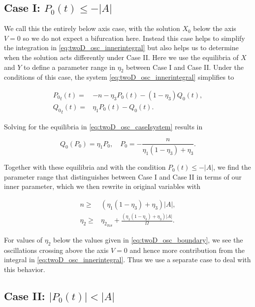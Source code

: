 \subsection{Case I: $P_0(t)\le -|A|$}
\label{subsec:twoD_highfreqosc_caseI}

We call this the entirely below axis case, with the solution $X_0$ below the axis $V=0$ so we do not expect a bifurcation here. Instead this case helps to simplify the integration in \eqref{eq:twoD_osc_innerintegral} but also helps us to determine when the solution acts differently under Case II. Here we use the equilibria of $X$ and $Y$ to define a parameter range in $\eta_2$ between Case I and Case II. Under the conditions of this case, the system \eqref{eq:twoD_osc_innerintegral} simplifies to

\begin{equation}\label{eq:twoD_osc_caseIsystem}
\begin{aligned}
{P_0}_t(t) =& -n -\eta_3P_0(t)-(1-\eta_3)Q_0(t),\\
{Q_0}_t(t) =& \eta_1P_0(t)-Q_0(t).
\end{aligned}
\end{equation}

Solving for the equilibria in \eqref{eq:twoD_osc_caseIsystem} results in

\begin{equation*}
Q_0(P_0)=\eta_1P_0,\quad P_0=-\frac{n}{\eta_1(1-\eta_3)+\eta_3}. 
\end{equation*}

Together with these equilibria and with the condition $P_0(t)\le -|A|$, we find the parameter range that distinguishes between Case I and Case II in terms of our inner parameter, which we then rewrite in original variables with

\begin{equation}\label{eq:twoD_osc_boundary}
\begin{aligned}
n\ge& (\eta_1(1-\eta_3)+\eta_3)|A|,\\
\eta_2\ge&{\eta_2}_{ns}+ \frac{(\eta_1(1-\eta_3)+\eta_3)|A|}{\Omega}.
\end{aligned}
\end{equation}

For values of $\eta_2$ below the values given in \eqref{eq:twoD_osc_boundary}, we see the oscillations crossing above the axis $V=0$ and hence more contribution from the integral in \eqref{eq:twoD_osc_innerintegral}. Thus we use a separate case to deal with this behavior.

\subsection{Case II: $|P_0(t)|<|A|$}
\label{subsec:twoD_highfreqosc_caseII}

